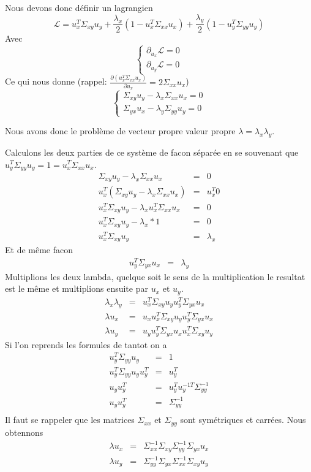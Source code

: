 \documentclass[a4paper, 11pt, onecolumn]{article}
\begin{document}
\begin{enumerate}
\begin{framed}
Nous devons donc définir un lagrangien
$$\mathcal{L} = u_x^T\Sigma_{xy}u_y+\frac{\lambda_x}{2}(1-u_x^T\Sigma_{xx}u_x)+\frac{\lambda_y}{2}(1-u_y^T\Sigma_{yy}u_y)$$
Avec 
$$
\left\{
\begin{array}{l}
\partial_{u_x}\mathcal{L}=0\\
\partial_{u_y}\mathcal{L}=0
\end{array}
\right.
$$
Ce qui nous donne (rappel: $\frac{\partial (u_x^T\Sigma_{xx}u_x)}{\partial u_x} = 2\Sigma_{xx}u_x$)
$$
\left\{
\begin{array}{l}
\Sigma_{xy}u_y-\lambda_x\Sigma_{xx}u_x=0\\
\Sigma_{yx}u_x-\lambda_y\Sigma_{yy}u_y=0
\end{array}
\right.
$$
\end{framed}

Nous avons donc le problème de vecteur propre valeur propre $\lambda = \lambda_x\lambda_y$.

\begin{framed}
Calculons les deux parties de ce système de facon séparée en se souvenant que $u_y^T\Sigma_{yy}u_y=1=u_x^T\Sigma_{xx}u_x$.
\begin{eqnarray}
\Sigma_{xy}u_y-\lambda_x\Sigma_{xx}u_x&=&0\\
u_x^T(\Sigma_{xy}u_y-\lambda_x\Sigma_{xx}u_x)&=&u_x^T0\\
u_x^T\Sigma_{xy}u_y-\lambda_xu_x^T\Sigma_{xx}u_x&=&0\\
u_x^T\Sigma_{xy}u_y-\lambda_x*1&=&0\\
u_x^T\Sigma_{xy}u_y&=&\lambda_x
\end{eqnarray}
Et de même facon
\begin{eqnarray}
u_y^T\Sigma_{yx}u_x&=&\lambda_y
\end{eqnarray}
Multiplions les deux lambda, quelque soit le sens de la multiplication le resultat est le même et multiplions ensuite par $u_x$ et $u_y$. 
\begin{eqnarray}
\lambda_x\lambda_y&=&u_x^T\Sigma_{xy}u_yu_y^T\Sigma_{yx}u_x\\
\lambda u_x&=&u_xu_x^T\Sigma_{xy}u_yu_y^T\Sigma_{yx}u_x\\
\lambda u_y&=&u_yu_y^T\Sigma_{yx}u_xu_x^T\Sigma_{xy}u_y
\end{eqnarray}
Si l'on reprends les formules de tantot on a
\begin{eqnarray}
u_y^T\Sigma_{yy}u_y&=&1\\
u_y^T\Sigma_{yy}u_yu_y^T&=&u_y^T\\
u_yu_y^T&=&u_y^Tu_y^{-1T}\Sigma_{yy}^{-1}\\
u_yu_y^T&=&\Sigma_{yy}^{-1}\\
\end{eqnarray}
Il faut se rappeler que les matrices $\Sigma_{xx}$ et $\Sigma_{yy}$ sont symétriques et carrées. Nous obtennons
\begin{eqnarray}
\lambda u_x&=&\Sigma_{xx}^{-1}\Sigma_{xy}\Sigma_{yy}^{-1}\Sigma_{yx}u_x\\
\lambda u_y&=&\Sigma_{yy}^{-1}\Sigma_{yx}\Sigma_{xx}^{-1}\Sigma_{xy}u_y
\end{eqnarray}
\end{framed}


\end{enumerate}
\end{document}
